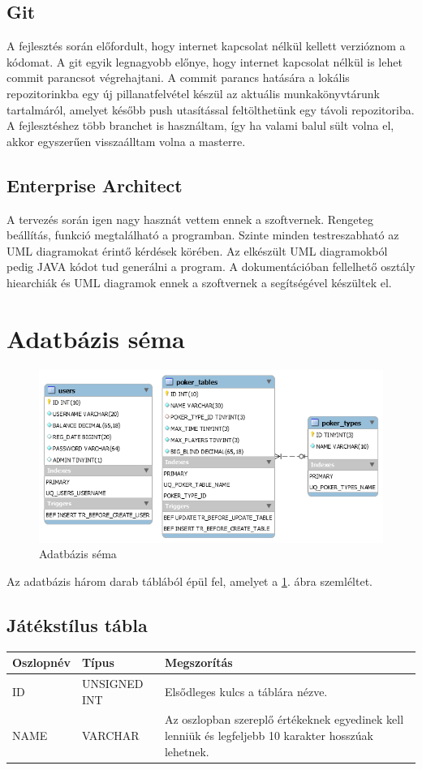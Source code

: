 \subsection{Git}
A fejlesztés során előfordult, hogy internet kapcsolat nélkül kellett verzióznom a kódomat. A git egyik legnagyobb előnye, hogy internet kapcsolat nélkül is lehet commit parancsot végrehajtani. A commit parancs hatására a lokális repozitorinkba egy új pillanatfelvétel készül az aktuális munkakönyvtárunk tartalmáról, amelyet később push utasítással feltölthetünk egy távoli repozitoriba. A fejlesztéshez több branchet is használtam, így ha valami balul sült volna el, akkor egyszerűen visszaálltam volna a masterre.

\subsection{Enterprise Architect}
A tervezés során igen nagy hasznát vettem ennek a szoftvernek. Rengeteg beállítás, funkció megtalálható a programban. Szinte minden testreszabható az UML diagramokat érintő kérdések körében. Az elkészült UML diagramokból pedig JAVA kódot tud generálni a program. A dokumentációban fellelhető osztály hiearchiák és UML diagramok ennek a szoftvernek a segítségével készültek el.

\section{Adatbázis séma}
\begin{figure}[h!]
  \caption{Adatbázis séma}
  \label{fig:db_scheme}
  \centering
    \includegraphics[width=\textwidth]{user-documentation/images/db_scheme2.png}
\end{figure}
Az adatbázis három darab táblából épül fel, amelyet a \ref{fig:db_scheme}. ábra szemléltet.

\subsection{Játékstílus tábla}
\begin{tabular}{| C{3.8cm} | C{4.2cm} | C{6.1cm} |}
\hline
 \textbf{Oszlopnév} & \textbf{Típus} & \textbf{Megszorítás} \\ \hline
  ID & UNSIGNED INT & Elsődleges kulcs a táblára nézve. \\ \hline
  NAME & VARCHAR & Az oszlopban szereplő értékeknek egyedinek kell lenniük és legfeljebb 10 karakter hosszúak lehetnek.  \\ \hline
\end{tabular}

